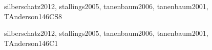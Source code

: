 \begin{syllabus}
\begin{unit}{\OSFileSystems}{}{silberschatz2012, stallings2005, tanenbaum2006, tanenbaum2001, TAnderson14}{6}{CS8}
\begin{topics}
      \item \OSFileSystemsTopicFiles
      \item \OSFileSystemsTopicDirectories
      \item \OSFileSystemsTopicFile
      \item \OSFileSystemsTopicStandard
      \item \OSFileSystemsTopicMemory
      \item \OSFileSystemsTopicSpecial
      \item \OSFileSystemsTopicNaming
      \item \OSFileSystemsTopicJournaling
\end{topics}
\begin{learningoutcomes}
	\item \OSFileSystemsLODescribeTheBe [\Familiarity]
	\item \OSFileSystemsLOCompareAndApproachesOrganization [\Assessment]
	\item \OSFileSystemsLOSummarizeHow [\Familiarity]
	\item \OSFileSystemsLOSummarizeTheJournaling [\Familiarity]
\end{learningoutcomes}
\end{unit}

\begin{unit}{\OSRealTimeandEmbeddedSystems}{}{silberschatz2012, stallings2005, tanenbaum2006, tanenbaum2001, TAnderson14}{6}{C1}
\begin{topics}
      \item \OSRealTimeandEmbeddedSystemsTopicProcess
      \item \OSRealTimeandEmbeddedSystemsTopicMemoryDisk
      \item \OSRealTimeandEmbeddedSystemsTopicFailures
      \item \OSRealTimeandEmbeddedSystemsTopicSpecialConcerns
\end{topics}
\begin{learningoutcomes}
	\item \OSRealTimeandEmbeddedSystemsLODescribeWhatSystem [\Familiarity]
	\item \OSRealTimeandEmbeddedSystemsLOExplainTheAnd [\Familiarity]
	\item \OSRealTimeandEmbeddedSystemsLOSummarizeSpecial [\Familiarity]
\end{learningoutcomes}
\end{unit}


\end{syllabus}
